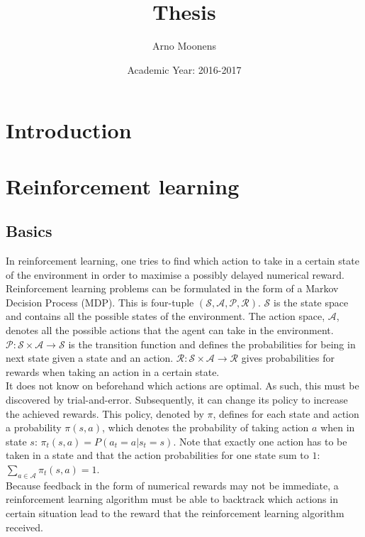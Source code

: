\documentclass[a4paper]{article}
\title{Thesis}
\author{Arno Moonens}
\date{Academic Year: 2016-2017}
\providecommand{\keywords}[1]{\textbf{\textit{Index terms---}} #1}
\begin{document}
\maketitle


\tableofcontents
\section{Introduction}
\section{Reinforcement learning}
\subsection{Basics}
In reinforcement learning, one tries to find which action to take in a certain state of the environment in order to maximise a possibly delayed numerical reward.\\
Reinforcement learning problems can be formulated in the form of a Markov Decision Process (MDP). This is four-tuple $(\mathcal{S}, \mathcal{A}, \mathcal{P}, \mathcal{R})$. $\mathcal{S}$ is the state space and contains all the possible states of the environment. The action space, $\mathcal{A}$, denotes all the possible actions that the agent can take in the environment. $\mathcal{P}: \mathcal{S} \times \mathcal{A} \to \mathcal{S}$ is the transition function and defines the probabilities for being in next state given a state and an action. $\mathcal{R}: \mathcal{S} \times \mathcal{A} \to \mathcal{R}$ gives probabilities for rewards when taking an action in a certain state.\\
It does not know on beforehand which actions are optimal. As such, this must be discovered by trial-and-error. Subsequently, it can change its policy to increase the achieved rewards. This policy, denoted by $\pi$, defines for each state and action a probability $\pi(s,a)$, which denotes the probability of taking action $a$ when in state $s$: $\pi_t(s,a) = P(a_t = a \vert s_t = s)$. Note that exactly one action has to be taken in a state and that the action probabilities for one state sum to $1$: $\sum_{a\in \mathcal{A}}\pi_t(s,a)=1$.\\
Because feedback in the form of numerical rewards may not be immediate, a reinforcement learning algorithm must be able to backtrack which actions in certain situation lead to the reward that the reinforcement learning algorithm received.\\
\end{document}
